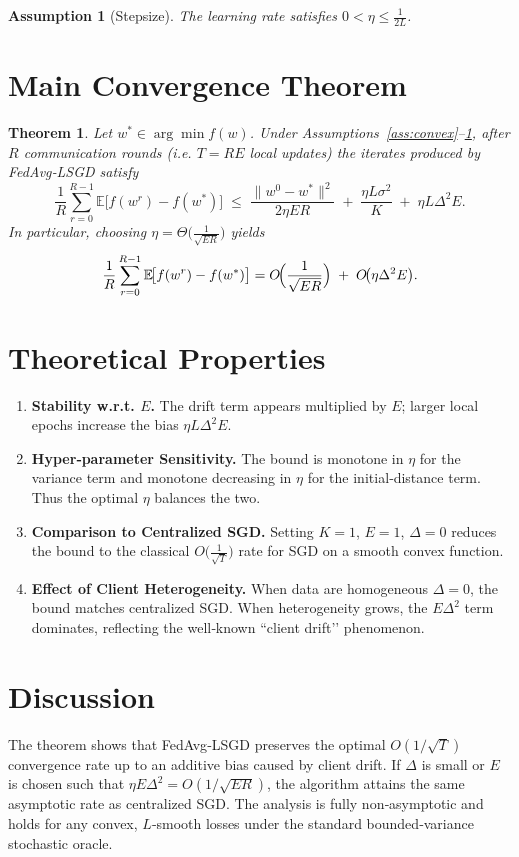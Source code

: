 \documentclass{article}
\newtheorem{theorem}{Theorem}
\newtheorem{assumption}{Assumption}
\newcommand{\E}{\mathbb{E}}
\begin{document}
\begin{assumption}[Stepsize]\label{ass:stepsize}
The learning rate satisfies $0<\eta\le \frac{1}{2L}$.
\end{assumption}

\section*{Main Convergence Theorem}
\begin{theorem}\label{thm:conv}
Let $w^{*}\in\arg\min f(w)$. Under Assumptions~\ref{ass:convex}–\ref{ass:stepsize},
after $R$ communication rounds (i.e. $T=RE$ local updates) the iterates produced by
FedAvg‑LSGD satisfy
\[
\frac{1}{R}\sum_{r=0}^{R-1}\E\!\bigl[f(w^{r})-f(w^{*})\bigr]
\;\le\;
\frac{\|w^{0}-w^{*}\|^{2}}{2\eta ER}
\;+\;
\frac{\eta L\sigma^{2}}{K}
\;+\;
\eta L\Delta^{2}E .
\]
In particular, choosing $\eta=\Theta\!\bigl(\frac{1}{\sqrt{ER}}\bigr)$ yields
\[
\frac{1}{R}\sum_{r=0}^{R-1}\E\!\bigl[f(w^{r})-f(w^{*})\bigr]=
O\!\Bigl(\frac{1}{\sqrt{ER}}\Bigr)
\;+\;O\!\bigl(\eta\Delta^{2}E\bigr).
\]
\end{theorem}

\section*{Theoretical Properties}
\begin{enumerate}
\item \textbf{Stability w.r.t. $E$.}  The drift term appears multiplied by $E$;
larger local epochs increase the bias $\eta L\Delta^{2}E$.
\item \textbf{Hyper‑parameter Sensitivity.}
The bound is monotone in $\eta$ for the variance term
and monotone decreasing in $\eta$ for the initial‑distance term.
Thus the optimal $\eta$ balances the two.
\item \textbf{Comparison to Centralized SGD.}
Setting $K=1$, $E=1$, $\Delta=0$ reduces the bound to the classical
$O\bigl(\frac{1}{\sqrt{T}}\bigr)$ rate for SGD on a smooth convex function.
\item \textbf{Effect of Client Heterogeneity.}
When data are homogeneous $\Delta=0$, the bound matches centralized SGD.
When heterogeneity grows, the $E\Delta^{2}$ term dominates, reflecting
the well‑known “client drift’’ phenomenon.
\end{enumerate}

\section*{Discussion}
The theorem shows that FedAvg‑LSGD preserves the optimal $O(1/\sqrt{T})$
convergence rate up to an additive bias caused by client drift.
If $\Delta$ is small or $E$ is chosen such that $\eta E\Delta^{2}=O(1/\sqrt{ER})$,
the algorithm attains the same asymptotic rate as centralized SGD.
The analysis is fully non‑asymptotic and holds for any convex, $L$‑smooth
losses under the standard bounded‑variance stochastic oracle.
\end{document}
